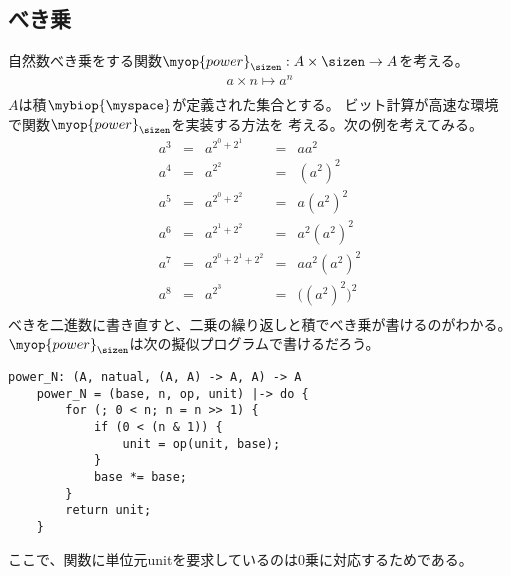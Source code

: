 \subsection{べき乗}\label{s2:自然数のべき乗} %
	自然数べき乗をする関数$\myop{power}_\sizen:A\times\sizen\to A$を考える。
	\begin{equation*}\begin{split} %
		a\times n \mapsto a^n \\
	\end{split}\end{equation*} %
	$A$は積$\mybiop{\myspace}$が定義された集合とする。
	ビット計算が高速な環境で関数$\myop{power}_\sizen$を実装する方法を
	考える。次の例を考えてみる。
	\begin{equation*}\begin{matrix} %
		a^3 &=& a^{2^0+2^1} &=& aa^2 \\
		a^4 &=& a^{2^2} &=& (a^2)^2 \\
		a^5 &=& a^{2^0+2^2} &=& a(a^2)^2 \\
		a^6 &=& a^{2^1+2^2} &=& a^2(a^2)^2 \\
		a^7 &=& a^{2^0+2^1+2^2} &=& aa^2(a^2)^2 \\
		a^8 &=& a^{2^3} &=& \bigl((a^2)^2\bigr)^2 \\
	\end{matrix}\end{equation*} %
	べきを二進数に書き直すと、二乗の繰り返しと積でべき乗が書けるのがわかる。
	$\myop{power}_\sizen$は次の擬似プログラムで書けるだろう。
	\begin{lstlisting}[caption=自然数べき乗のプログラム
	, label=code:自然数べき乗のプログラム]
	power_N: (A, natual, (A, A) -> A, A) -> A
	power_N = (base, n, op, unit) |-> do {
		for (; 0 < n; n = n >> 1) {
			if (0 < (n & 1)) {
				unit = op(unit, base);
			}
			base *= base;
		}
		return unit;
	}
	\end{lstlisting}
	ここで、関数に単位元unitを要求しているのは$0$乗に対応するためである。
